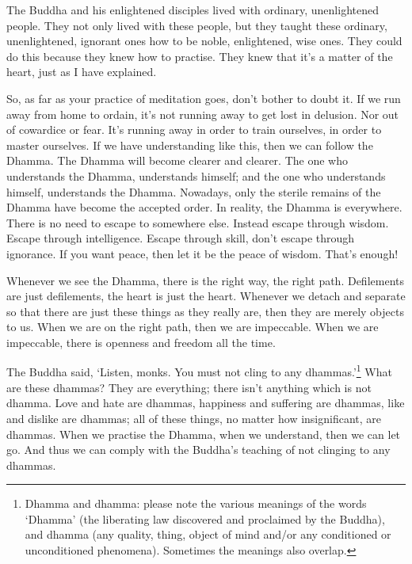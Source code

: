 The Buddha and his enlightened disciples lived with ordinary, un\-en\-light\-ened people. They not only lived with these people, but they taught these ordinary, unenlightened, ignorant ones how to be noble, enlightened, wise ones. They could do this because they knew how to practise. They knew that it's a matter of the heart, just as I have explained.

So, as far as your practice of meditation goes, don't bother to doubt it. If we run away from home to ordain, it's not running away to get lost in delusion. Nor out of cowardice or fear. It's running away in order to train ourselves, in order to master ourselves. If we have understanding like this, then we can follow the Dhamma. The Dhamma will become clearer and clearer. The one who understands the Dhamma, understands himself; and the one who understands himself, understands the Dhamma. Nowadays, only the sterile remains of the Dhamma have become the accepted order. In reality, the Dhamma is everywhere. There is no need to escape to somewhere else. Instead escape through wisdom. Escape through intelligence. Escape through skill, don't escape through ignorance. If you want peace, then let it be the peace of wisdom. That's enough!

Whenever we see the Dhamma, there is the right way, the right path. Defilements are just defilements, the heart is just the heart. Whenever we detach and separate so that there are just these things as they really are, then they are merely objects to us. When we are on the right path, then we are impeccable. When we are impeccable, there is openness and freedom all the time.

The Buddha said, `Listen, monks. You must not cling to any dhammas.'\footnote{Dhamma and dhamma: please note the various meanings of the words `Dhamma' (the liberating law discovered and proclaimed by the Buddha), and dhamma (any quality, thing, object of mind and/or any conditioned or unconditioned phenomena). Sometimes the meanings also overlap.} What are these dhammas? They are everything; there isn't anything which is not dhamma. Love and hate are dhammas, happiness and suffering are dhammas, like and dislike are dhammas; all of these things, no matter how insignificant, are dhammas. When we practise the Dhamma, when we understand, then we can let go. And thus we can comply with the Buddha's teaching of not clinging to any dhammas.

